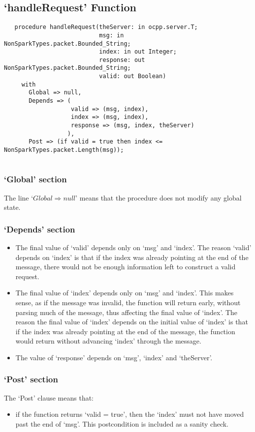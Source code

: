 \documentclass[12pt,openany,a4paper]{book}
\begin{document}
\subsection{`handleRequest' Function}
\begin{verbatim}
   procedure handleRequest(theServer: in ocpp.server.T;
                           msg: in NonSparkTypes.packet.Bounded_String;
                           index: in out Integer;
                           response: out NonSparkTypes.packet.Bounded_String;
                           valid: out Boolean)
     with
       Global => null,
       Depends => (
                   valid => (msg, index),
                   index => (msg, index),
                   response => (msg, index, theServer)
                  ),
       Post => (if valid = true then index <= NonSparkTypes.packet.Length(msg));
   
\end{verbatim}
\subsubsection{`Global' section}
The line `$Global \Rightarrow null$' means that the procedure does not modify any global state.
\subsubsection{`Depends' section}
\begin{itemize}
\item The final value of `valid' depends only on `msg' and `index'. The reason `valid' depends on `index' is that if the index was already pointing at the end of the message, there would not be enough information left to construct a valid request.
\item The final value of `index' depends only on `msg' and `index'. This makes sense, as if the message was invalid, the function will return early, without parsing much of the message, thus affecting the final value of `index'. The reason the final value of `index' depends on the initial value of `index' is that if the index was already pointing at the end of the message, the function would return without advancing `index' through the message.
\item The value of `response' depends on `msg', `index' and `theServer'. 
\end{itemize}
\subsubsection{`Post' section}
The `Post' clause means that:
\begin{itemize}
\item if the function returns `valid = true', then the `index' must not have moved past the end of `msg'. This postcondition is included as a sanity check. 
\end{itemize}
\end{document}
